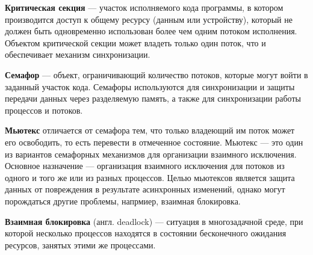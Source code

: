 \textbf{Критическая секция} --- участок исполняемого кода программы, в котором
производится доступ к общему ресурсу (данным или устройству), который
не должен быть одновременно использован более чем одним потоком исполнения.
Объектом критической секции может владеть только один поток,
что и обеспечивает механизм синхронизации.

\textbf{Семафор} --- объект, ограничивающий количество потоков, которые могут
войти в заданный участок кода. Семафоры используются для синхронизации
и защиты передачи данных через разделяемую память, а также для синхронизации
работы процессов и потоков.

\textbf{Мьютекс} отличается от семафора тем, что только владеющий им поток
может его освободить, то есть перевести в отмеченное состояние.
Мьютекс --- это один из вариантов семафорных механизмов для организации
взаимного исключения. Основное назначение --- организация взаимного исключения
для потоков из одного и того же или из разных процессов.
Целью мьютексов является защита данных от повреждения в результате асинхронных
изменений, однако могут порождаться другие проблемы, напрмиер, взаимная блокировка.

\textbf{Взаимная блокировка} (англ. deadlock) --- ситуация в многозадачной среде,
при которой несколько процессов находятся в состоянии бесконечного ожидания ресурсов,
занятых этими же процессами.

